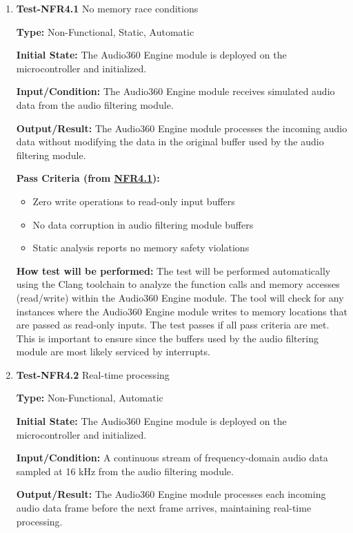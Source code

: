 \documentclass[12pt, titlepage]{article}
\begin{document}
\begin{enumerate}
\item{\textbf{Test-NFR4.1} No memory race conditions\\}

\textbf{Type:} Non-Functional, Static, Automatic

\textbf{Initial State:}
The Audio360 Engine module is deployed on the microcontroller and initialized.

\textbf{Input/Condition:}
The Audio360 Engine module receives simulated audio data from the audio
filtering module.

\textbf{Output/Result:}
The Audio360 Engine module processes the incoming audio data without modifying
the data in the original buffer used by the audio filtering module.

\textbf{Pass Criteria (from \hyperref[SRS-NFR4_1]{NFR4.1}):}
\begin{itemize}
\item Zero write operations to read-only input buffers
\item No data corruption in audio filtering module buffers
\item Static analysis reports no memory safety violations
\end{itemize}

\textbf{How test will be performed:}
The test will be performed automatically using the Clang toolchain to analyze
the function calls and memory accesses (read/write) within the Audio360 Engine
module. The tool will check for any instances where the Audio360 Engine module
writes to memory locations that are passed as read-only inputs. The test passes
if all pass criteria are met. This is important to ensure since the buffers used
by the audio filtering module are most likely serviced by interrupts. 

\item{\textbf{Test-NFR4.2} Real-time processing\\}

\textbf{Type:} Non-Functional, Automatic

\textbf{Initial State:}
The Audio360 Engine module is deployed on the microcontroller and initialized.

\textbf{Input/Condition:}
A continuous stream of frequency-domain audio data sampled at 16 kHz from the
audio filtering module.

\textbf{Output/Result:}
The Audio360 Engine module processes each incoming audio data frame before the
next frame arrives, maintaining real-time processing.


\end{enumerate}
\end{document}
